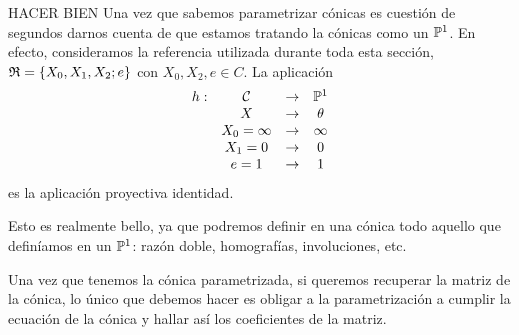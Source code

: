 \begin{obs} HACER BIEN
	Una vez que sabemos parametrizar cónicas es cuestión de segundos darnos cuenta de que estamos tratando la cónicas como un $\mathbb{P}^1$. En efecto, consideramos la referencia utilizada durante toda esta sección, $\mathfrak{R}=\{X_0,X_1,X_2;e\}$ con $X_0,X_2,e\in C$. La aplicación
	\[\begin{array}{cccc}
		h:& \mathcal{C}&\rightarrow &\mathbb{P}^1\\
		&X&\rightarrow &\theta\\
		&X_0=\infty&\rightarrow &\infty\\
		&X_1=0&\rightarrow &0\\
		&e=1&\rightarrow &1\\
	\end{array}\]
	es la aplicación proyectiva identidad.
	
	Esto es realmente bello, ya que podremos definir en una cónica todo aquello que definíamos en un $\mathbb{P}^1$: razón doble, homografías, involuciones, etc.
\end{obs}
\begin{obs}
	Una vez que tenemos la cónica parametrizada, si queremos recuperar la matriz de la cónica, lo único que debemos hacer es obligar a la parametrización a cumplir la ecuación de la cónica y hallar así los coeficientes de la matriz.
\end{obs}

